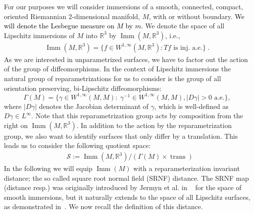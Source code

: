 \documentclass[final,hidelinks,onefignum,onetabnum]{siamart220329}
\newcommand{\reals}{\mathbb{R}}
\newcommand{\DiffLip}{\Gamma}
\newcommand{\Imm}{\operatorname{Imm}}
\begin{document}
For our purposes we will consider immersions of a smooth, connected, compact, oriented Riemannian 2-dimensional manifold, $M$, with or without boundary. \textcolor{black}{We will denote the Lesbegue measure on $M$ by $m$.} We denote the space of all Lipschitz immersions of $M$ into $\reals^3$ by $\Imm(M,\reals^3)$, i.e.,
\begin{align}
\Imm(M,\reals^3)=\{f\in W^{1,\infty}(M,\reals^3): Tf \text{ is inj. a.e.}\}\;.    
\end{align}
As we are interested in unparametrized surfaces, we have to factor out the action of the group of diffeomorphisms. In the context of Lipschitz immersions the natural group of reparametrizations for us to consider is the group of all 
orientation preserving, bi-Lipschitz diffeomorphisms:
 \begin{equation*}
     \DiffLip(M)=\{ \gamma\in W^{1,\infty}(M,M):\; \gamma^{-1}\in W^{1,\infty}(M,M), |D\gamma|>0 \text{ a.e.}\},
     \end{equation*} 
where  $|D\gamma|$ denotes the Jacobian determinant of $\gamma$, which is well-defined as $D\gamma\in L^{\infty}$.
Note that  this reparametrization group acts by composition from the right on $\Imm(M,\reals^3)$. In addition to the action by the reparametrization group, we also want to identify surfaces that only differ by a translation. This leads us to consider the following quotient space:
\begin{align}
&\mathcal S:=\Imm(M,\mathbb R^3)/(\DiffLip(M)\times\operatorname{trans}) 
\end{align}
In the following we will equip $\Imm(M)$ with a reparameterization invariant distance; the so called square root normal field (SRNF) distance. The SRNF map (distance resp.) was originally introduced by Jermyn et al. 
in ~\cite{jermyn2012elastic} for the space of smooth immersions, but it naturally  extends to the space of all Lipschitz surfaces, as demonstrated in~\cite{bauer2022SRNF}. We now recall the definition of this distance.
\end{document}
